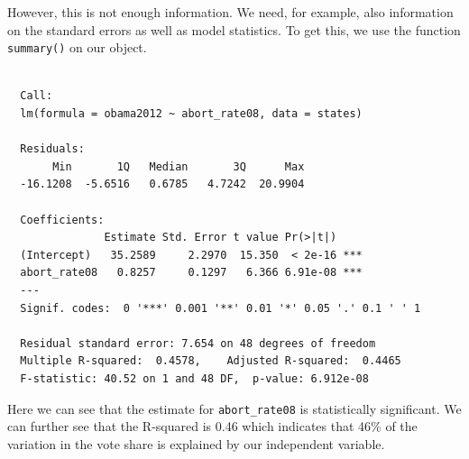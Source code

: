 \documentclass[12pt,oneside]{reedthesis}
\theoremstyle{definition}
\theoremstyle{definition}
\theoremstyle{definition}
\theoremstyle{remark}
\begin{document}
  However, this is not enough information. We need, for example, also
  information on the standard errors as well as model statistics. To get
  this, we use the function \texttt{summary()} on our object.
  \begin{Shaded}
  \begin{Highlighting}[]
  \end{Highlighting}
  \end{Shaded}
  \begin{verbatim}
  
  Call:
  lm(formula = obama2012 ~ abort_rate08, data = states)
  
  Residuals:
       Min       1Q   Median       3Q      Max 
  -16.1208  -5.6516   0.6785   4.7242  20.9904 
  
  Coefficients:
               Estimate Std. Error t value Pr(>|t|)    
  (Intercept)   35.2589     2.2970  15.350  < 2e-16 ***
  abort_rate08   0.8257     0.1297   6.366 6.91e-08 ***
  ---
  Signif. codes:  0 '***' 0.001 '**' 0.01 '*' 0.05 '.' 0.1 ' ' 1
  
  Residual standard error: 7.654 on 48 degrees of freedom
  Multiple R-squared:  0.4578,    Adjusted R-squared:  0.4465 
  F-statistic: 40.52 on 1 and 48 DF,  p-value: 6.912e-08
  \end{verbatim}
  Here we can see that the estimate for \texttt{abort\_rate08} is
  statistically significant. We can further see that the R-squared is 0.46
  which indicates that 46\% of the variation in the vote share is
  explained by our independent variable.
  
\end{document}
